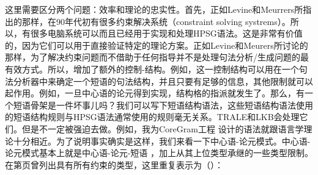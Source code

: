 这里需要区分两个问题：效率和理论的忠实性。首先，正如Levine和Meurrers所指出的那样，在90年代初有很多约束解决系统（constraint solving systrems）。所以，有很多电脑系统可以而且已经用于实现和处理HPSG语法。这是非常有价值的，因为它们可以用于直接验证特定的理论方案。正如Levine和Meurers所讨论的那样，为了解决约束问题而不借助于任何指导并不是处理句法分析/生成问题的最有效方式。所以，增加了额外的控制-结构。例如，这一控制结构可以用在一个句法分析器中来确定一个短语的句法结构，并且只要有足够的信息，其他限制就可以起作用。例如，一旦中心语的论元得到实现，结构格的指派就发生了。那么，有一个短语骨架是一件坏事儿吗？我们可以写下短语结构语法，这些短语结构语法使用的短语结构规则与HPSG语法通常使用的规则毫无关系。TRALE\citep*{MPR2002a-u,Penn2004a-u}和LKB会处理它们。但是不一定被强迫去做。例如，我为CoreGram工程 \citep{MuellerCoreGramBrief,MuellerCoreGram}设计的语法就跟语言学理论十分相近。为了说明事实确实是这样，我们来看一下中心语-论元模式。中心语-论元模式基本上就是中心语-论元-短语 ，加上从其上位类型承继的一些类型限制。在第\pageref{head-arg-schema-hfp}页曾列出具有所有约束的类型，这里重复表示为（）：
